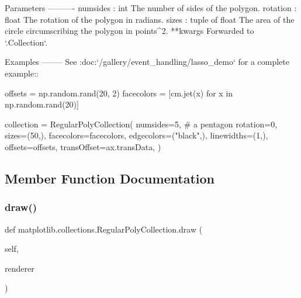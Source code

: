 \begin{DoxyVerb}Parameters
----------
numsides : int
    The number of sides of the polygon.
rotation : float
    The rotation of the polygon in radians.
sizes : tuple of float
    The area of the circle circumscribing the polygon in points^2.
**kwargs
    Forwarded to `.Collection`.

Examples
--------
See :doc:`/gallery/event_handling/lasso_demo` for a complete example::

    offsets = np.random.rand(20, 2)
    facecolors = [cm.jet(x) for x in np.random.rand(20)]

    collection = RegularPolyCollection(
numsides=5, # a pentagon
rotation=0, sizes=(50,),
facecolors=facecolors,
edgecolors=("black",),
linewidths=(1,),
offsets=offsets,
transOffset=ax.transData,
)
\end{DoxyVerb}
 

\subsection{Member Function Documentation}
\mbox{\label{classmatplotlib_1_1collections_1_1RegularPolyCollection_abb5880647d32c4e7b2cb869d12702038}} 
\subsubsection{\texorpdfstring{draw()}{draw()}}
{\footnotesize\ttfamily def matplotlib.\+collections.\+Regular\+Poly\+Collection.\+draw (\begin{DoxyParamCaption}\item[{}]{self,  }\item[{}]{renderer }\end{DoxyParamCaption})}

\mbox{\label{classmatplotlib_1_1collections_1_1RegularPolyCollection_af4c0bf0bf8e8ff9c99bea071cc81efea}} 
